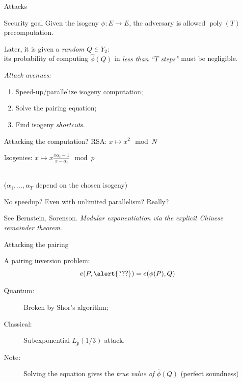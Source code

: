 \documentclass[aspectratio=169]{beamer}
\DeclareMathOperator{\poly}{poly}
\begin{document}

\begin{frame}{Attacks}
  \begin{block}{Security goal}
    Given the isogeny \emph{$\phi:E\to E$}, the adversary is allowed
    $\poly(T)$ precomputation.

    \bigskip
    Later, it is given a \emph{random $Q\in Y_2$}:\\
    its probability of computing \emph{$\hat\phi(Q)$} in \emph{less
      than ``$T$ steps''} must be negligible.
  \end{block}

  \smallskip
  \emph{Attack avenues:}
  \begin{enumerate}
  \item Speed-up/parallelize isogeny computation;
  \item Solve the pairing equation;
  \item Find isogeny \textit{shortcuts}.
  \end{enumerate}
\end{frame}


\begin{frame}{Attacking the computation?}
  \large
  RSA: \hfill $x \longmapsto x^2\mod N$ \hspace{4em}

  \vfill
  Isogenies: \hfill $\displaystyle x \longmapsto x\frac{x\alpha_i-1}{x-\alpha_i}\mod p$ \hspace{4em}\strut\\
  {\normalsize\color{gray} ($\alpha_1,\dots,\alpha_T$ depend on the chosen isogeny)}
  
  \vfill
  \centering
  No speedup? Even with unlimited parallelism? Really?
  
  \medskip
  See Bernstein, Sorenson. \emph{Modular exponentiation via the
    explicit Chinese remainder theorem}.
\end{frame}


\begin{frame}{Attacking the pairing}
  \large

  A pairing inversion problem:
  \[e(P, \alert{???}) = e(\phi(P), Q)\]

  \bigskip
  \begin{description}
  \item[Quantum:] Broken by Shor's algorithm;
  \item[Classical:] Subexponential \emph{$L_p(1/3)$} attack.\\[1em]
  \item[Note:] Solving the equation gives the \emph{true value of
      $\hat\phi(Q)$} (perfect soundness)
  \end{description}
\end{frame}
\end{document}
